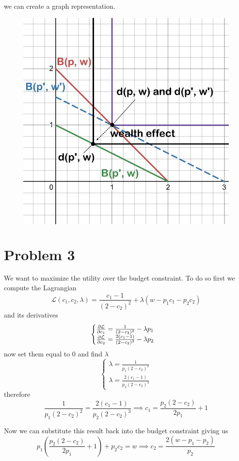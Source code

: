 \documentclass[12pt]{extarticle}
\numberwithin{table}{section}
\numberwithin{figure}{section}
\numberwithin{equation}{section}
\begin{document}
we can create a graph representation.
\begin{figure}[H]
    \centering
    \includegraphics[width=0.5\linewidth]{assets/decision-theory/ps2-ex2.jpg}
\end{figure}


\section*{Problem 3}

We want to maximize the utility over the budget constraint.
To do so first we compute the Lagrangian
\begin{equation}
    \mathcal L(c_1, c_2, \lambda) = \frac{c_1 -1}{(2 - c_2)^2} + \lambda(w - p_1 c_1 - p_2 c_2)
\end{equation}
and its derivatives
\begin{equation}
    \begin{cases}
        \pdv{\mathcal L}{c_1} = \frac{1}{(2-c_2)^2} - \lambda p_1 \\
        \pdv{\mathcal L}{c_2} = \frac{2(c_1 - 1)}{(2-c_2)^3} - \lambda p_2
    \end{cases}
\end{equation}
now set them equal to $0$ and find $\lambda$
\begin{equation}
    \begin{cases}
        \lambda = \frac{1}{p_1 (2-c_2)^2} \\
        \lambda = \frac{2(c_1 - 1)}{p_2 (2-c_2)^3}
    \end{cases}
\end{equation}
therefore
\begin{equation}
    \frac{1}{p_1 (2-c_2)^2} = \frac{2(c_1 - 1)}{p_2 (2-c_2)^3}
    \implies c_1 = \frac{p_2(2-c_2)}{2p_1} + 1
\end{equation}

Now we can substitute this result back into the budget constraint giving us
\begin{equation}
    p_1 \left( \frac{p_2(2-c_2)}{2p_1} + 1 \right) + p_2 c_2 = w
    \implies c_2 = \frac{2(w - p_1 - p_2)}{p_2}
\end{equation}
\end{document}
